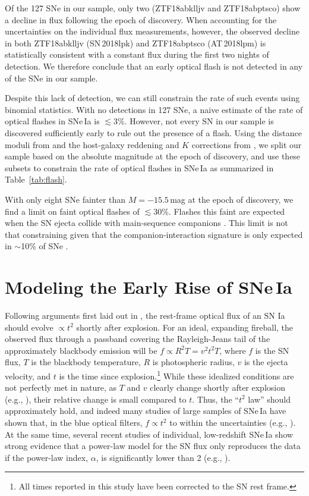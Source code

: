 \documentclass[twocolumn]{./aastex63}
\begin{document}
Of the 127 SNe in our sample, only two (ZTF18abklljv and ZTF18abptsco)
show a decline in flux following the epoch of discovery. When accounting for
the uncertainties on the individual flux measurements, however, the observed
decline in both ZTF18abklljv (SN\,2018lpk) and ZTF18abptsco (AT\,2018lpm) is
statistically consistent with a constant flux during the first two nights of
detection. We therefore conclude that an early optical flash is not detected
in any of the SNe in our sample.

Despite this lack of detection, we can still constrain the rate of such
events using binomial statistics. With no detections in 127 SNe, a naive
estimate of the rate of optical flashes in SNe\,Ia is $\lesssim$3\%. However,
not every SN in our sample is discovered sufficiently early to rule out the
presence of a flash. Using the distance moduli from \citet{Yao19} and the
host-galaxy reddening and $K$ corrections from \citet{Bulla20}, we split our
sample based on the absolute magnitude at the epoch of discovery, and use
these subsets to constrain the rate of optical flashes in SNe\,Ia as
summarized in Table~\ref{tab:flash}.



With only eight SNe fainter than $M = -15.5$\,mag at the epoch of
discovery, we find a limit on faint optical flashes of $\lesssim$30\%. Flashes
this faint are expected when the SN ejecta collide with main-sequence
companions \citep[e.g.,][]{Kasen10a}. This limit is not that constraining
given that the companion-interaction signature is only expected in $\sim$10\%
of SNe \citep{Kasen10a}.

\section{Modeling the Early Rise of SNe\,Ia}\label{sec:model}

Following arguments first laid out in \citet{Riess99a}, the rest-frame optical
flux of an SN Ia should evolve $\propto t^2$ shortly after explosion. For an
ideal, expanding fireball, the observed flux through a passband covering the
Rayleigh-Jeans tail of the approximately blackbody emission will be $f \propto
R^2 T = v^2 t^2 T$, where $f$ is the SN flux, $T$ is the blackbody
temperature, $R$ is photospheric radius, $v$ is the ejecta velocity, and $t$
is the time since explosion.\footnote{All times reported in this study have
been corrected to the SN rest frame.} While these idealized conditions are not
perfectly met in nature, as $T$ and $v$ clearly change shortly after explosion
(e.g., \citealt{Parrent12}), their relative change is small compared to $t$.
Thus, the ``$t^2$ law'' should approximately hold, and indeed many studies of
large samples of SNe\,Ia have shown that, in the blue optical filters, $f
\propto t^2$ to within the uncertainties (e.g., \citealt{Conley06, Hayden10,
Ganeshalingam11, Gonzalez-Gaitan12}). At the same time, several recent studies
of individual, low-redshift SNe\,Ia show strong evidence that a power-law
model for the SN flux only reproduces the data if the power-law index,
$\alpha$, is significantly lower than 2 (e.g.,
\citealt{Zheng13,Zheng14,Shappee16,Miller18,Dimitriadis19,Fausnaugh19}).
\end{document}
